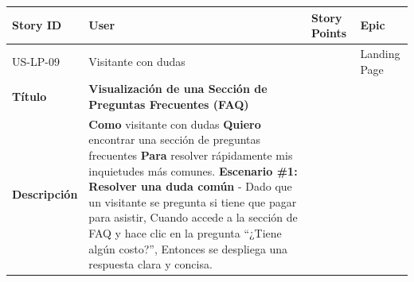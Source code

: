 {\def\LTcaptype{none} %
\begin{longtable}[]{@{}
  >{\raggedright\arraybackslash}p{}
  >{\raggedright\arraybackslash}p{}
  >{\raggedright\arraybackslash}p{}
  >{\raggedright\arraybackslash}p{}@{}}
\toprule\noalign{}
\begin{minipage}[b]{\linewidth}\raggedright
Story ID
\end{minipage} & \begin{minipage}[b]{\linewidth}\raggedright
User
\end{minipage} & \begin{minipage}[b]{\linewidth}\raggedright
Story Points
\end{minipage} & \begin{minipage}[b]{\linewidth}\raggedright
Epic
\end{minipage} \\
\midrule\noalign{}
\endhead
\bottomrule\noalign{}
\endlastfoot
US-LP-09 & Visitante con dudas & 2 & Landing Page \\
\textbf{Título} & \textbf{Visualización de una Sección de Preguntas
Frecuentes (FAQ)} & & \\
\textbf{Descripción} & \textbf{Como} visitante con dudas \textbf{Quiero}
encontrar una sección de preguntas frecuentes \textbf{Para} resolver
rápidamente mis inquietudes más comunes. \textbf{Escenario \#1: Resolver
una duda común} - Dado que un visitante se pregunta si tiene que pagar
para asistir, Cuando accede a la sección de FAQ y hace clic en la
pregunta ``¿Tiene algún costo?'', Entonces se despliega una respuesta
clara y concisa. & & \\
\end{longtable}
}

